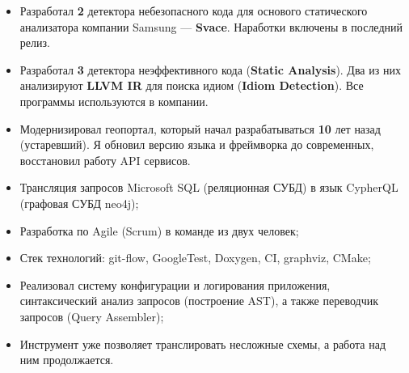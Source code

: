 \documentclass[10pt,a4paper,ragged2e,withhyper]{custom-altacv}
\begin{document}
\begin{paracol}{2}


\begin{itemize}
	\item Разработал \textbf{2} детектора небезопасного кода для основого статического анализатора компании Samsung --- \textbf{Svace}. Наработки включены в последний релиз.
\end{itemize}

\divider


\begin{itemize}
	\item Разработал \textbf{3} детектора неэффективного кода (\textbf{Static Analysis}). Два из них анализируют \textbf{LLVM IR} для поиска идиом (\textbf{Idiom Detection}). Все программы используются в компании.
\end{itemize}

\divider


\begin{itemize}
	\item Модернизировал геопортал, который начал разрабатываться \textbf{10} лет назад (устаревший). Я обновил версию языка и фреймворка до современных, восстановил работу API сервисов.
\end{itemize}





\begin{itemize}
	\item Трансляция запросов Microsoft SQL (реляционная СУБД) в язык CypherQL (графовая СУБД neo4j);
	\item Разработка по Agile (Scrum) в команде из двух человек;
	\item Стек технологий: git-flow, GoogleTest, Doxygen, CI, graphviz, CMake;
	\item Реализовал систему конфигурации и логирования приложения, синтаксический анализ запросов (построение AST), а также переводчик запросов (Query Assembler);
	\item Инструмент уже позволяет транслировать несложные схемы, а работа над ним продолжается.
\end{itemize}


\end{paracol}
\end{document}
